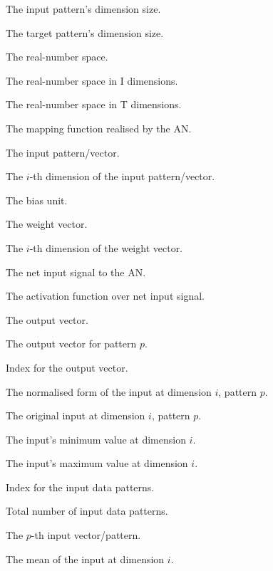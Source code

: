 \begin{description}
	\item [\parbox{1cm}{$I$}] The input pattern's dimension size.
	\item [\parbox{1cm}{$T$}] The target pattern's dimension size.
	\item [\parbox{1cm}{$\mathbb{R}$}] The real-number space.
	\item [\parbox{1cm}{$\mathbb{R}^{I}$}] The real-number space in I dimensions.
	\item [\parbox{1cm}{$\mathbb{R}^{T}$}] The real-number space in T dimensions.
	\item [\parbox{1cm}{$f_{AN}$}] The mapping function realised by the \acs{AN}.
	\item [\parbox{1cm}{$\boldsymbol{x}$}] The input pattern/vector.
	\item [\parbox{1cm}{$x_{i}$}] The $i$-th dimension of the input pattern/vector.
	\item [\parbox{1cm}{$\theta$}] The bias unit.
	\item [\parbox{1cm}{$\boldsymbol{v}$}] The weight vector.
	\item [\parbox{1cm}{$v_{i}$}] The $i$-th dimension of the weight vector.
	\item [\parbox{1cm}{$net$}] The net input signal to the \acs{AN}.
	\item [\parbox{1cm}{$f(net)$}] The activation function over net input signal.
	\item [\parbox{1cm}{$\boldsymbol{y}$}] The output vector.
	\item [\parbox{1cm}{$\boldsymbol{y}_{p}$}] The output vector for pattern $p$.
	\item [\parbox{1cm}{$k$}] Index for the output vector.
	\item [\parbox{1cm}{$x_{i,p}^{'}$}] The normalised form of the input at dimension $i$, pattern $p$.
	\item [\parbox{1cm}{$x_{i,p}$}] The original input at dimension $i$, pattern $p$.
	\item [\parbox{1cm}{$x_{i_{min}}$}] The input's minimum value at dimension $i$.
	\item [\parbox{1cm}{$x_{i_{max}}$}] The input's maximum value at dimension $i$.
	\item [\parbox{1cm}{$p$}] Index for the input data patterns.
	\item [\parbox{1cm}{$P$}] Total number of input data patterns.
	\item [\parbox{1cm}{$\boldsymbol{x}_p$}] The $p$-th input vector/pattern.
	\item [\parbox{1cm}{$\mu_i$}] The mean of the input at dimension $i$.

\end{description}
